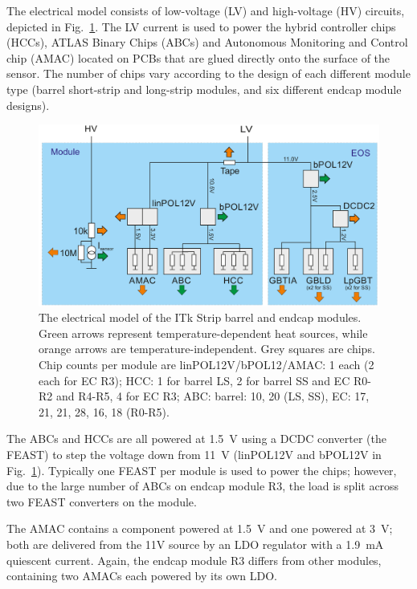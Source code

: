 
The electrical model consists of low-voltage (LV) and high-voltage (HV) circuits, depicted in
Fig.~\ref{electrical_model}. The LV current is used to power the hybrid controller chips (HCCs),
ATLAS Binary Chips (ABCs) and Autonomous Monitoring and Control chip (AMAC) located on PCBs that are
glued directly onto the surface of the sensor. The number of chips vary according to the design of
each different module type (barrel short-strip and long-strip modules, and six different endcap
module designs).

\begin{figure}[ht!]
\centering
\includegraphics[width=0.8\linewidth]{figures/electrical_model.pdf}
\caption{
The electrical model of the ITk Strip barrel and endcap modules. Green arrows represent temperature-dependent heat sources, while orange arrows are temperature-independent. Grey squares are chips. Chip counts per module are linPOL12V/bPOL12/AMAC: 1 each (2 each for EC R3); HCC: 1 for barrel LS, 2 for barrel SS and EC R0-R2 and R4-R5, 4 for EC R3; ABC: barrel: 10, 20 (LS, SS), EC: 17, 21, 21, 28, 16, 18 (R0-R5).
}
\label{electrical_model}
\end{figure}

The ABCs and HCCs are all powered at 1.5~V using a DCDC converter (the FEAST) to step the voltage down
from 11~V (linPOL12V and bPOL12V in Fig.~\ref{electrical_model}). Typically one FEAST per module is used to power the chips; however, due to the large
number of ABCs on endcap module R3, the load is split across two FEAST converters on the module.

The AMAC contains a component powered at 1.5~V and one powered at 3~V; both are delivered from the
11V source by an LDO regulator with a 1.9~mA quiescent current.
Again, the endcap module R3 differs from other modules, containing two AMACs each powered by its own
LDO.

